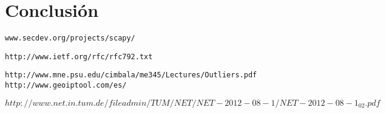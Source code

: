 \section{Conclusión}

 
\begin{thebibliography}{9}
\texttt{www.secdev.org/projects/scapy/}

\texttt{http://www.ietf.org/rfc/rfc792.txt}

\texttt{http://www.mne.psu.edu/cimbala/me345/Lectures/Outliers.pdf
}
\texttt{http://www.geoiptool.com/es/}

\texttt{$http://www.net.in.tum.de/fileadmin/TUM/NET/NET-2012-08-1/
NET-2012-08-1_02.pdf$}

\end{thebibliography}
